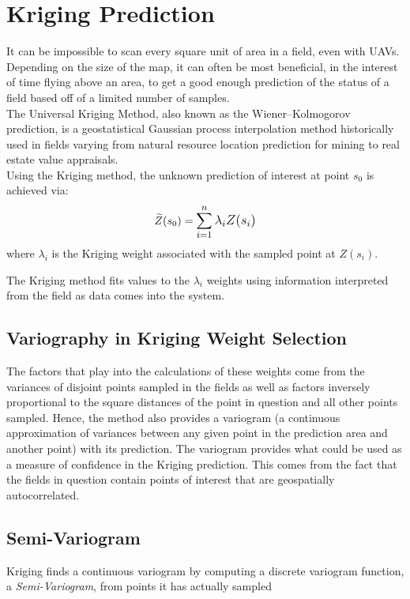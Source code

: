 \documentclass[11pt]{ucthesis}
\begin{document}
\section{Kriging Prediction}
It can be impossible to scan every square unit of area in a field, even with UAVs. Depending on the size of the map, it can often be most beneficial, in the interest of time flying above an area, to get a good enough prediction of the status of a field based off of a limited number of samples.\\
The Universal Kriging Method, also known as the Wiener–Kolmogorov prediction, is a geostatistical Gaussian process interpolation method historically used in fields varying from natural resource location prediction for mining to real estate value appraisals.\\

Using the Kriging method, the unknown prediction of interest at point $s_{0}$ is achieved via:
\begin{equation}
\widetilde{Z}(s_{0})=\mathlarger{\sum\limits_{i=1}^{n}\lambda_{i}Z(s_{i})}
\end{equation}
where $\lambda_{i}$ is the Kriging weight associated with the sampled point at $Z(s_{i})$.

The Kriging method fits values to the $\lambda_{i}$ weights using information interpreted from the field as data comes into the system. 

\subsection{Variography in Kriging Weight Selection}
The factors that play into the calculations of these weights come from the variances of disjoint points sampled in the fields as well as factors inversely proportional to the square distances of the point in question and all other points sampled. Hence, the method also provides a variogram (a continuous approximation of variances between any given point in the prediction area and another point) with its prediction. The variogram provides what could be used as a measure of confidence in the Kriging prediction. This comes from the fact that the fields in question contain points of interest that are geospatially autocorrelated. 

\subsection{Semi-Variogram}
Kriging finds a continuous variogram by computing a discrete variogram function, a \textit{Semi-Variogram}, from points it has actually sampled
\end{document}
